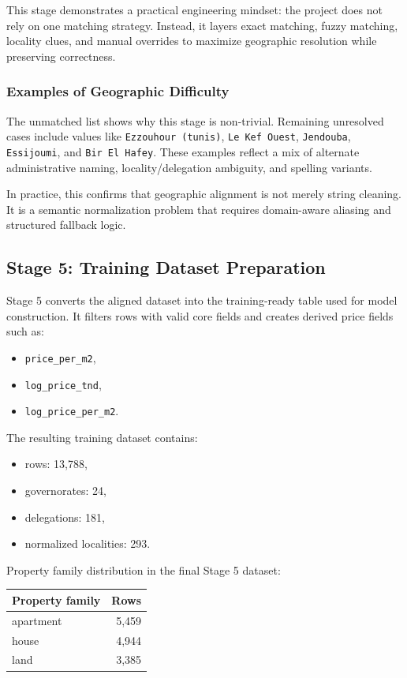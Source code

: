 \documentclass[11pt,a4paper]{article}
\newcommand{\code}[1]{\texttt{#1}}
\begin{document}
This stage demonstrates a practical engineering mindset: the project does not rely on one matching strategy. Instead, it layers exact matching, fuzzy matching, locality clues, and manual overrides to maximize geographic resolution while preserving correctness.

\subsubsection{Examples of Geographic Difficulty}

The unmatched list shows why this stage is non-trivial. Remaining unresolved cases include values like \code{Ezzouhour (tunis)}, \code{Le Kef Ouest}, \code{Jendouba}, \code{Essijoumi}, and \code{Bir El Hafey}. These examples reflect a mix of alternate administrative naming, locality/delegation ambiguity, and spelling variants.

In practice, this confirms that geographic alignment is not merely string cleaning. It is a semantic normalization problem that requires domain-aware aliasing and structured fallback logic.

\subsection{Stage 5: Training Dataset Preparation}

Stage 5 converts the aligned dataset into the training-ready table used for model construction. It filters rows with valid core fields and creates derived price fields such as:

\begin{itemize}
\item \code{price\_per\_m2},
\item \code{log\_price\_tnd},
\item \code{log\_price\_per\_m2}.
\end{itemize}

The resulting training dataset contains:

\begin{itemize}
\item rows: 13,788,
\item governorates: 24,
\item delegations: 181,
\item normalized localities: 293.
\end{itemize}

Property family distribution in the final Stage 5 dataset:

\begin{center}
\begin{tabular}{lr}
\toprule
Property family & Rows \\
\midrule
apartment & 5,459 \\
house & 4,944 \\
land & 3,385 \\
\bottomrule
\end{tabular}
\end{center}
\end{document}
